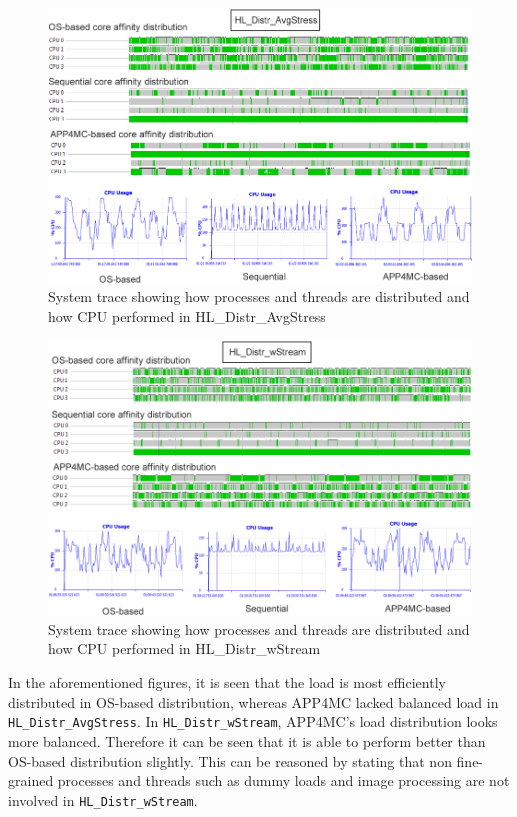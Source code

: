 \begin{figure}[!ht]
	\centering
	\captionsetup{justification=centering}
	\includegraphics[width=\textwidth]{content/images/tracesAvgStress.png}
	\caption{System trace showing how processes and threads are distributed and how CPU performed in HL{\_}Distr{\_}AvgStress}
	\label{fig:tracesAvgStress}
\end{figure}

\begin{figure}[!ht]
	\centering
	\captionsetup{justification=centering}
	\includegraphics[width=\textwidth]{content/images/traceswStream.png}
	\caption{System trace showing how processes and threads are distributed and how CPU performed in HL{\_}Distr{\_}wStream}
	\label{fig:traceswStream}
\end{figure}

In the aforementioned figures, it is seen that the load is most efficiently distributed in OS-based distribution, whereas APP4MC lacked balanced load in \texttt{HL{\_}Distr{\_}AvgStress}. In \texttt{HL{\_}Distr{\_}wStream}, APP4MC's load distribution looks more balanced. Therefore it can be seen that it is able to perform better than OS-based distribution slightly. This can be reasoned by stating that non fine-grained processes and threads such as dummy loads and image processing are not involved in \texttt{HL{\_}Distr{\_}wStream}. 

